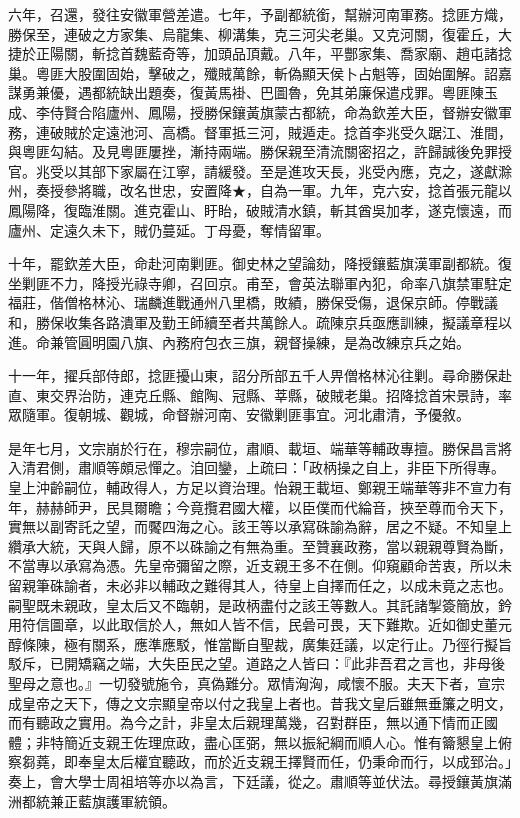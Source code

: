 \begin{pinyinscope}
六年，召還，發往安徽軍營差遣。七年，予副都統銜，幫辦河南軍務。捻匪方熾，勝保至，連破之方家集、烏龍集、柳溝集，克三河尖老巢。又克河關，復霍丘，大捷於正陽關，斬捻首魏藍奇等，加頭品頂戴。八年，平酆家集、喬家廟、趙屯諸捻巢。粵匪大股圍固始，擊破之，殲賊萬餘，斬偽顯天侯卜占魁等，固始圍解。詔嘉謀勇兼優，遇都統缺出題奏，復黃馬褂、巴圖魯，免其弟廉保遣戍罪。粵匪陳玉成、李侍賢合陷廬州、鳳陽，授勝保鑲黃旗蒙古都統，命為欽差大臣，督辦安徽軍務，連破賊於定遠池河、高橋。督軍抵三河，賊遁走。捻首李兆受久踞江、淮間，與粵匪勾結。及見粵匪屢挫，漸持兩端。勝保親至清流關密招之，許歸誠後免罪授官。兆受以其部下家屬在江寧，請緩發。至是進攻天長，兆受內應，克之，遂獻滁州，奏授參將職，改名世忠，安置降★，自為一軍。九年，克六安，捻首張元龍以鳳陽降，復臨淮關。進克霍山、盱眙，破賊清水鎮，斬其酋吳加孝，遂克懷遠，而廬州、定遠久未下，賊仍蔓延。丁母憂，奪情留軍。

十年，罷欽差大臣，命赴河南剿匪。御史林之望論劾，降授鑲藍旗漢軍副都統。復坐剿匪不力，降授光祿寺卿，召回京。甫至，會英法聯軍內犯，命率八旗禁軍駐定福莊，偕僧格林沁、瑞麟進戰通州八里橋，敗績，勝保受傷，退保京師。停戰議和，勝保收集各路潰軍及勤王師續至者共萬餘人。疏陳京兵亟應訓練，擬議章程以進。命兼管圓明園八旗、內務府包衣三旗，親督操練，是為改練京兵之始。

十一年，擢兵部侍郎，捻匪擾山東，詔分所部五千人畀僧格林沁往剿。尋命勝保赴直、東交界治防，連克丘縣、館陶、冠縣、莘縣，破賊老巢。招降捻首宋景詩，率眾隨軍。復朝城、觀城，命督辦河南、安徽剿匪事宜。河北肅清，予優敘。

是年七月，文宗崩於行在，穆宗嗣位，肅順、載垣、端華等輔政專擅。勝保昌言將入清君側，肅順等頗忌憚之。洎回鑾，上疏曰：「政柄操之自上，非臣下所得專。皇上沖齡嗣位，輔政得人，方足以資治理。怡親王載垣、鄭親王端華等非不宣力有年，赫赫師尹，民具爾瞻；今竟攬君國大權，以臣僕而代綸音，挾至尊而令天下，實無以副寄託之望，而饜四海之心。該王等以承寫硃諭為辭，居之不疑。不知皇上纘承大統，天與人歸，原不以硃諭之有無為重。至贊襄政務，當以親親尊賢為斷，不當專以承寫為憑。先皇帝彌留之際，近支親王多不在側。仰窺顧命苦衷，所以未留親筆硃諭者，未必非以輔政之難得其人，待皇上自擇而任之，以成未竟之志也。嗣聖既未親政，皇太后又不臨朝，是政柄盡付之該王等數人。其託諸掣簽簡放，鈐用符信圖章，以此取信於人，無如人皆不信，民碞可畏，天下難欺。近如御史董元醇條陳，極有關系，應準應駁，惟當斷自聖裁，廣集廷議，以定行止。乃徑行擬旨駁斥，已開矯竊之端，大失臣民之望。道路之人皆曰：『此非吾君之言也，非母後聖母之意也。』一切發號施令，真偽難分。眾情洶洶，咸懷不服。夫天下者，宣宗成皇帝之天下，傳之文宗顯皇帝以付之我皇上者也。昔我文皇后雖無垂簾之明文，而有聽政之實用。為今之計，非皇太后親理萬幾，召對群臣，無以通下情而正國體；非特簡近支親王佐理庶政，盡心匡弼，無以振紀綱而順人心。惟有籥懇皇上俯察芻蕘，即奉皇太后權宜聽政，而於近支親王擇賢而任，仍秉命而行，以成郅治。」奏上，會大學士周祖培等亦以為言，下廷議，從之。肅順等並伏法。尋授鑲黃旗滿洲都統兼正藍旗護軍統領。


\end{pinyinscope}
